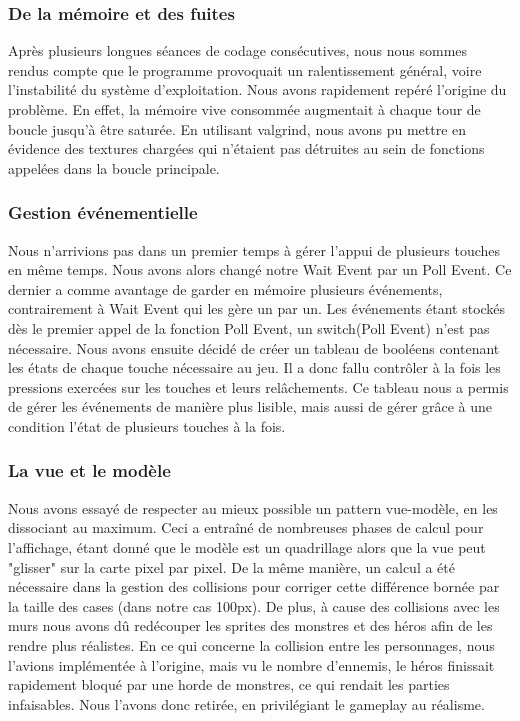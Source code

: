 	\subsubsection{De la mémoire et des fuites}

Après plusieurs longues séances de codage consécutives, nous nous sommes rendus compte que le programme provoquait un ralentissement général, voire l'instabilité du système d'exploitation. Nous avons rapidement repéré l'origine du problème. En effet, la mémoire vive consommée augmentait à chaque tour de boucle jusqu'à être saturée. En utilisant valgrind, nous avons pu mettre en évidence des textures chargées qui n'étaient pas détruites au sein de fonctions appelées dans la boucle principale.

	\subsubsection{Gestion événementielle}
	
	Nous n'arrivions pas dans un premier temps à gérer l'appui de plusieurs touches en même temps. Nous avons alors changé notre Wait Event par un Poll Event. Ce dernier a comme avantage de garder en mémoire plusieurs événements, contrairement à Wait Event qui les gère un par un. Les événements étant stockés dès le premier appel de la fonction Poll Event, un switch(Poll Event) n'est pas nécessaire. Nous avons ensuite décidé de créer un tableau de booléens contenant les états de chaque touche nécessaire au jeu. Il a donc fallu contrôler à la fois les pressions exercées sur les touches et leurs relâchements. Ce tableau nous a permis de gérer les événements de manière plus lisible, mais aussi de gérer grâce à une condition l'état de plusieurs touches à la fois. 

	\subsubsection{La vue et le modèle}

Nous avons essayé de respecter au mieux possible un pattern vue-modèle, en les dissociant au maximum. Ceci a entraîné de nombreuses phases de calcul pour l'affichage, étant donné que le modèle est un quadrillage alors que la vue peut "glisser" sur la carte pixel par pixel. De la même manière, un calcul a été nécessaire dans la gestion des collisions pour corriger cette différence bornée par la taille des cases (dans notre cas 100px). De plus, à cause des collisions avec les murs nous avons dû redécouper les sprites des monstres et des héros afin de les rendre plus réalistes. En ce qui concerne la collision entre les personnages, nous l'avions implémentée à l'origine, mais vu le nombre d'ennemis, le héros finissait rapidement bloqué par une horde de monstres, ce qui rendait les parties infaisables. Nous l'avons donc retirée, en privilégiant le gameplay au réalisme.
